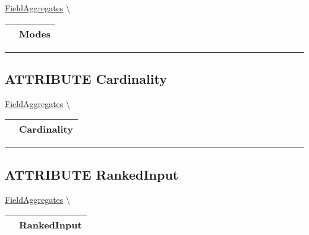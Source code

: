 \hypertarget{ecldoc:ml_core.fieldaggregates.modes}{}
\hspace{0pt} \hyperlink{ecldoc:ml_core.fieldaggregates}{FieldAggregates} \textbackslash 

{\renewcommand{\arraystretch}{1.5}
\begin{tabularx}{\textwidth}{|>{\raggedright\arraybackslash}l|X|}
\hline
\hspace{0pt}\mytexttt{\color{red} } & \textbf{Modes} \\
\hline
\end{tabularx}
}

\par


\rule{\linewidth}{0.5pt}
\subsection*{\textsf{\colorbox{headtoc}{\color{white} ATTRIBUTE}
Cardinality}}

\hypertarget{ecldoc:ml_core.fieldaggregates.cardinality}{}
\hspace{0pt} \hyperlink{ecldoc:ml_core.fieldaggregates}{FieldAggregates} \textbackslash 

{\renewcommand{\arraystretch}{1.5}
\begin{tabularx}{\textwidth}{|>{\raggedright\arraybackslash}l|X|}
\hline
\hspace{0pt}\mytexttt{\color{red} } & \textbf{Cardinality} \\
\hline
\end{tabularx}
}

\par


\rule{\linewidth}{0.5pt}
\subsection*{\textsf{\colorbox{headtoc}{\color{white} ATTRIBUTE}
RankedInput}}

\hypertarget{ecldoc:ml_core.fieldaggregates.rankedinput}{}
\hspace{0pt} \hyperlink{ecldoc:ml_core.fieldaggregates}{FieldAggregates} \textbackslash 

{\renewcommand{\arraystretch}{1.5}
\begin{tabularx}{\textwidth}{|>{\raggedright\arraybackslash}l|X|}
\hline
\hspace{0pt}\mytexttt{\color{red} } & \textbf{RankedInput} \\
\hline
\end{tabularx}
}

